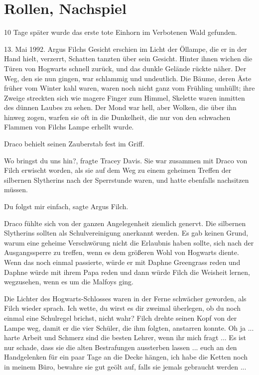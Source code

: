 \chapter{Rollen, Nachspiel}

10 Tage später wurde das erste tote Einhorn im Verbotenen Wald gefunden.

13. Mai 1992. Argus Filchs Gesicht erschien im Licht der Öllampe, die er in der
Hand hielt, verzerrt, Schatten tanzten über sein Gesicht. Hinter ihnen
wichen die Türen von Hogwarts schnell zurück, und das dunkle Gelände
rückte näher. Der Weg, den sie nun gingen, war schlammig und undeutlich.
Die Bäume, deren Äste früher vom Winter kahl waren, waren noch nicht ganz
vom Frühling umhüllt; ihre Zweige streckten sich wie magere Finger zum
Himmel, Skelette waren inmitten des dünnen Laubes zu sehen. Der Mond war
hell, aber Wolken, die über ihn hinweg zogen, warfen sie oft in die
Dunkelheit, die nur von den schwachen Flammen von Filchs Lampe erhellt
wurde.

Draco behielt seinen Zauberstab fest im Griff.

\glqq{}Wo bringst du uns hin?\grqq{}, fragte Tracey Davis. Sie war zusammen mit
Draco von Filch erwischt worden, als sie auf dem Weg zu einem geheimen
Treffen der silbernen Slytherins nach der Sperrstunde waren, und hatte
ebenfalls nachsitzen müssen.

\glqq{}Du folgst mir einfach\grqq{}, sagte Argus Filch.

Draco fühlte sich von der ganzen Angelegenheit ziemlich genervt. Die silbernen
Slytherins sollten als Schulvereinigung anerkannt werden. Es gab keinen
Grund, warum eine geheime Verschwörung nicht die Erlaubnis haben sollte,
sich nach der Ausgangssperre zu treffen, wenn es dem größeren Wohl von
Hogwarts diente. Wenn das noch einmal passierte, würde er mit Daphne
Greengrass reden und Daphne würde mit ihrem Papa reden und dann würde
Filch die Weisheit lernen, wegzusehen, wenn es um die Malfoys ging.

Die Lichter des Hogwarts-Schlosses waren in der Ferne schwächer geworden, als
Filch wieder sprach. \glqq{}Ich wette, du wirst es dir zweimal überlegen,
ob du noch einmal eine Schulregel brichst, nicht wahr?\grqq{} Filch
drehte seinen Kopf von der Lampe weg, damit er die vier Schüler, die ihm
folgten, anstarren konnte. \glqq{}Oh ja ... harte Arbeit und Schmerz sind
die besten Lehrer, wenn ihr mich fragt ... Es ist nur schade, dass sie die
alten Bestrafungen aussterben lassen ... euch an den Handgelenken für ein
paar Tage an die Decke hängen, ich habe die Ketten noch in meinem Büro,
bewahre sie gut geölt auf, falls sie jemals gebraucht werden ...\grqq{}

